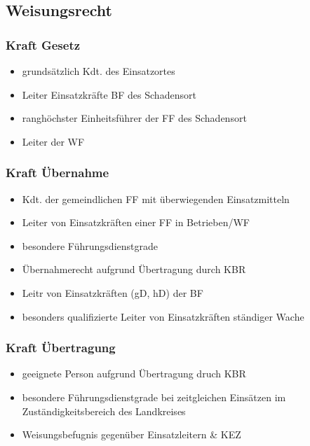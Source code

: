 \subsection{Weisungsrecht}
\begin{normbox}{\subsubsection{Kraft Gesetz}}
    \begin{itemize}
        \item grundsätzlich Kdt. des Einsatzortes
        \item Leiter Einsatzkräfte BF des Schadensort
        \item ranghöchster Einheitsführer der FF des Schadensort
        \item Leiter der WF
    \end{itemize}
\end{normbox}
\begin{normbox}{\subsubsection{Kraft Übernahme}}
    \begin{itemize}
        \item Kdt. der gemeindlichen FF mit überwiegenden Einsatzmitteln
        \item Leiter von Einsatzkräften einer FF in Betrieben/WF
        \item besondere Führungsdienstgrade
        \item Übernahmerecht aufgrund Übertragung durch KBR
        \item Leitr von Einsatzkräften (gD, hD) der BF
        \item besonders qualifizierte Leiter von Einsatzkräften ständiger Wache
    \end{itemize}
\end{normbox}
\begin{normbox}{\subsubsection{Kraft Übertragung}}
    \begin{itemize}
        \item geeignete Person aufgrund Übertragung druch KBR
        \item besondere Führungsdienstgrade bei zeitgleichen Einsätzen im Zuständigkeitsbereich des Landkreises
        \item Weisungsbefugnis gegenüber Einsatzleitern \& KEZ
    \end{itemize}
\end{normbox}
